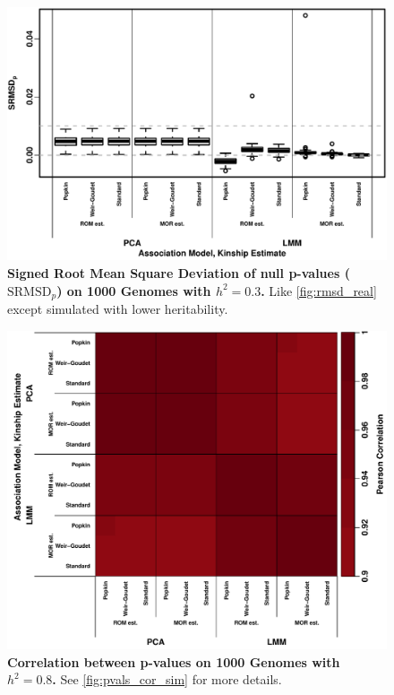 \documentclass[11pt]{article}
\newcommand{\rmsd}{\text{SRMSD}_p}
\begin{document}
\begin{figure}[hp!]
  \centering
  \includegraphics[width=\textwidth]{tgp-nygc-autosomes_ld_prune_1000kb_0.3_maf-0.01/h-0.3/rmsd.pdf}
  \caption{
    {\bf Signed Root Mean Square Deviation of null p-values ($\rmsd$) on 1000 Genomes with $h^2=0.3$.}
    Like \cref{fig:rmsd_real} except simulated with lower heritability.
  }
  \label{fig:rmsd_real-h3}
\end{figure}

\begin{figure}[bp!]
  \centering
  \includegraphics[width=\textwidth]{tgp-nygc-autosomes_ld_prune_1000kb_0.3_maf-0.01/pvals_cor.pdf}
  \caption{
    {\bf Correlation between p-values on 1000 Genomes with $h^2=0.8$.}
    See \cref{fig:pvals_cor_sim} for more details.
  }
  \label{fig:pvals_cor_real}
\end{figure}
\end{document}

